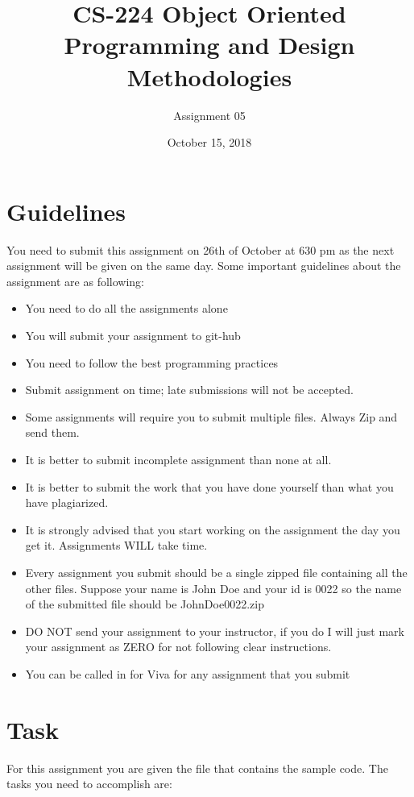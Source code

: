 \documentclass[a4paper,12pt]{article}
\begin{document}
	
	\title{CS-224 Object Oriented Programming and Design Methodologies }
	\author{Assignment 05}
	\date{October 15, 2018}
	\maketitle
	\section{Guidelines}
	You need to submit this assignment on  {\color{red}26th of October at 630 pm } as the next assignment will be given on the same day. Some important guidelines about the assignment are as following:
	
	\begin{itemize}
		\item You need to do all the assignments alone
		\item You will submit your assignment to git-hub 
		\item You need to follow the best programming practices 
		\item Submit assignment on time; late submissions will not be accepted.
		\item Some assignments will require you to submit multiple files. Always Zip and send them.
		\item It is better to submit incomplete assignment than none at all.
		\item It is better to submit the work that you have done yourself than what you have plagiarized.
		\item It is strongly advised that you start working on the assignment the day you get it. Assignments WILL take time.
		\item Every assignment you submit should be a single zipped file containing all the other files. Suppose your name is John Doe and your id is 0022 so the name of the submitted file should be JohnDoe0022.zip
		\item DO NOT send your assignment to your instructor, if you do I will just mark your assignment as ZERO for not following clear instructions.
		\item You can be called in for Viva for any assignment that you submit
	\end{itemize}
	
	\section{Task}
	For this assignment you are given the file  that contains the sample code. The tasks you need to accomplish are:\smallskip\\
	
\end{document}

